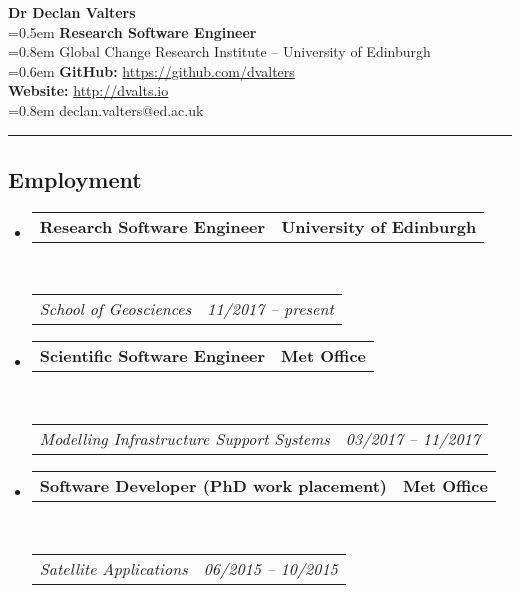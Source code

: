 \documentclass[10.5pt,a4]{article}
\makeatletter
\newcommand{\headerrow}[2]
{\begin{tabular*}{\linewidth}{l@{\extracolsep{\fill}}r}
	#1 &
	#2 \\
\end{tabular*}}
\makeatother
\begin{document}
\begin{flushleft}
{\LARGE \textbf{Dr Declan Valters}} \\
\parskip=0.5em
{\textbf{\large{Research Software Engineer}} \\ 
\parskip=0.8em
Global Change Research Institute -- University of Edinburgh} \\
\parskip=0.6em
\textbf{GitHub:} \url{https://github.com/dvalters} \\ 
\textbf{Website:} \url{http://dvalts.io} \\
\parskip=0.8em 
declan.valters@ed.ac.uk
\end{flushleft}



\hrule
\vspace{-0.4em}


\subsection*{Employment}
\begin{itemize}
	\parskip=0.1em

	\item
	\headerrow
		{\textbf{Research Software Engineer}}
		{\textbf{University of Edinburgh}}
	\\
	\headerrow
		{\emph{School of Geosciences}}
		{\emph{11/2017 -- present}}

	\item
	\headerrow
		{\textbf{Scientific Software Engineer}}
		{\textbf{Met Office}}
	\\
	\headerrow
		{\emph{Modelling Infrastructure Support Systems}}
		{\emph{03/2017 -- 11/2017}}

	\item
	\headerrow
		{\textbf{Software Developer (PhD work placement)}}
		{\textbf{Met Office}}
	\\
	\headerrow
		{\emph{Satellite Applications}}
		{\emph{06/2015 -- 10/2015}}

\end{itemize}
\end{document}
